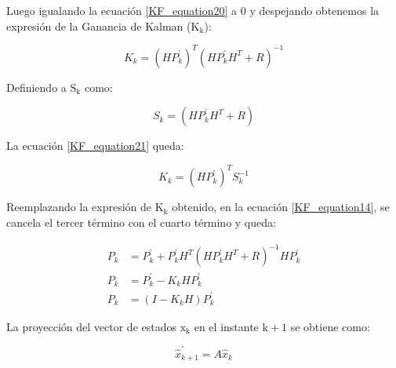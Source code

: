 \documentclass[10pt,a4paper]{article}
\begin{document}
	\noindent Luego igualando la ecuación \ref{KF_equation20} a 0 y despejando 
    obtenemos la expresión de la Ganancia de Kalman ($\mathrm{K_k}$):
	
	\begin{figure}[h!]
		\begin{center}
			\begin{equation}
				K_k = (H P^\prime_k)^T (H P^\prime_k H^T + R)^{-1} 
				\label{KF_equation21}
			\end{equation}	
		\end{center}
	\end{figure}
	
	\clearpage
	
    \noindent Definiendo a $\mathrm{S_k}$ como:
	
	\begin{figure}[h!]
		\begin{center}
			\begin{equation}
				S_k = (H P^\prime_k H^T + R)
				\label{KF_equation22}
			\end{equation}	
		\end{center}
	\end{figure}
	
	\noindent La ecuación \ref{KF_equation21} queda:
	
	\begin{figure}[h!]
		\begin{center}
			\begin{equation}
				K_k = (H P^\prime_k)^T S_k^{-1} 
				\label{K_Gain}
			\end{equation}	
		\end{center}
	\end{figure}
	
    \noindent Reemplazando la expresión de $\mathrm{K_k}$ obtenido, en la 
    ecuación  \ref{KF_equation14}, se cancela el tercer término con el cuarto 
    término y queda:
	
	\begin{align}
		P_k  &= P^\prime_k + P^\prime_k H^T (H P^\prime_k H^T + R)^{-1} H P^\prime_k \nonumber \\
		P_k  &= P^\prime_k - K_k H P^\prime_k \nonumber\\
		P_k  &= (I - K_k H) P^\prime_k	
		\label{KF_equation23}	
	\end{align}
	
    \noindent La proyección del vector de estados $\mathrm{x_k}$ en el instante 
    $\mathrm{k+1}$ se obtiene como:
	
	\begin{figure}[h!]
		\begin{center}
			\begin{equation}
				\hat{x}^\prime_{k+1} = A \hat{x}_k 
				\label{x_k_projection}
			\end{equation}	
		\end{center}
	\end{figure}
	
\end{document}
